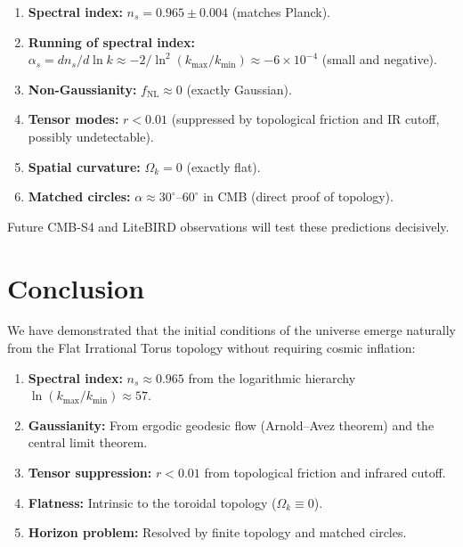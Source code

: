 \documentclass[12pt,a4paper]{article}
\begin{document}
\begin{enumerate}
    \item \textbf{Spectral index:} $n_s = 0.965 \pm 0.004$ (matches Planck).
    
    \item \textbf{Running of spectral index:} $\alpha_s = dn_s/d\ln k \approx -2/\ln^2(k_{\max}/k_{\min}) \approx -6 \times 10^{-4}$ (small and negative).
    
    \item \textbf{Non-Gaussianity:} $f_{\mathrm{NL}} \approx 0$ (exactly Gaussian).
    
    \item \textbf{Tensor modes:} $r < 0.01$ (suppressed by topological friction and IR cutoff, possibly undetectable).
    
    \item \textbf{Spatial curvature:} $\Omega_k = 0$ (exactly flat).
    
    \item \textbf{Matched circles:} $\alpha \approx 30^\circ\text{--}60^\circ$ in CMB (direct proof of topology).
\end{enumerate}

Future CMB-S4 and LiteBIRD observations will test these predictions decisively.

\section{Conclusion}

We have demonstrated that the initial conditions of the universe emerge naturally from the Flat Irrational Torus topology without requiring cosmic inflation:

\begin{enumerate}
    \item \textbf{Spectral index:} $n_s \approx 0.965$ from the logarithmic hierarchy $\ln(k_{\max}/k_{\min}) \approx 57$.
    
    \item \textbf{Gaussianity:} From ergodic geodesic flow (Arnold--Avez theorem) and the central limit theorem.
    
    \item \textbf{Tensor suppression:} $r < 0.01$ from topological friction and infrared cutoff.
    
    \item \textbf{Flatness:} Intrinsic to the toroidal topology ($\Omega_k \equiv 0$).
    
    \item \textbf{Horizon problem:} Resolved by finite topology and matched circles.
\end{enumerate}
\end{document}
